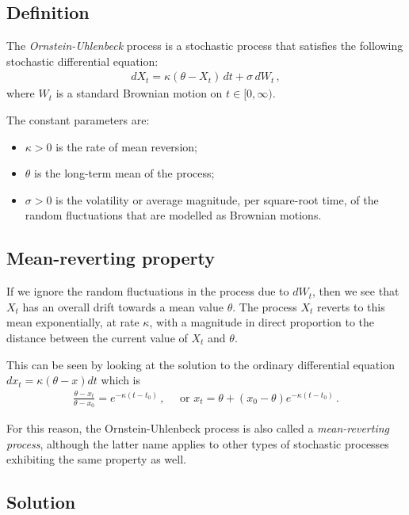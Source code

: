 \documentclass[12pt]{article}
\begin{document}
\subsection*{Definition}

The \emph{Ornstein-Uhlenbeck} process is a stochastic process
that satisfies the following stochastic differential equation:
\begin{align}\label{eq:sde}
dX_t = \kappa ( \theta - X_t) \, dt + \sigma \, dW_t\,,
\end{align}
where $W_t$ is a standard Brownian motion on $t \in [0, \infty)$.

The constant parameters are:
\begin{itemize}
\item
$\kappa > 0$ is the rate of mean reversion;
\item
$\theta$ is the long-term mean of the process;
\item
$\sigma>0$ is the volatility or average magnitude, per square-root time,
of the random fluctuations that are modelled as Brownian motions.
\end{itemize}



\subsection*{Mean-reverting property}

If we ignore the random fluctuations in the process
due to $dW_t$, then we see that $X_t$ has an overall drift
towards a mean value $\theta$.
The process $X_t$ reverts to this mean exponentially, at rate $\kappa$,
with a magnitude in direct proportion to the distance
between the current value of $X_t$ and $\theta$.

This can be seen by looking at the solution to the 
ordinary differential equation $dx_t = \kappa (\theta - x) dt$
which is
\begin{align}\label{eq:ode}
\frac{\theta - x_t}{\theta-x_0} = e^{-\kappa(t-t_0) } \,,
\quad \text{ or } 
x_t = \theta + (x_0 - \theta) e^{-\kappa(t-t_0) }\,. 
\end{align}

For this reason, the Ornstein-Uhlenbeck process
is also called a \emph{mean-reverting process},
although the latter name applies to other types
of stochastic processes exhibiting the same property as well.


\subsection*{Solution}
\end{document}
